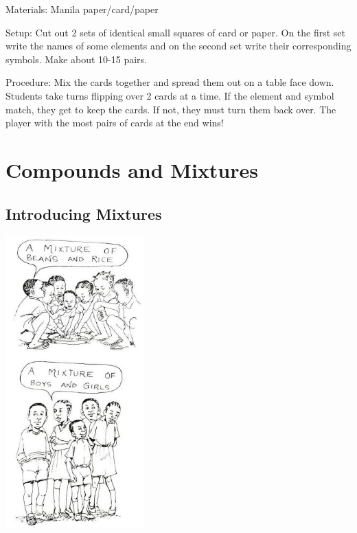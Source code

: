 \begin{multicols}{2}
\begin{description*}
\item[Materials:]{Manila paper/card/paper}
\item[Setup:]{Cut out 2 sets of identical small squares of card or paper. On the first set write the names of some elements and on the second set write their corresponding symbols. Make about 10-15 pairs. }
\item[Procedure:]{Mix the cards together and spread them out on a table face down. Students take turns flipping over 2 cards at a time. If the element and symbol match, they get to keep the cards. If not, they must turn them back over. The player with the most pairs of cards at the end wins!}
\end{description*}


\section*{Compounds and Mixtures}


\subsection{Introducing Mixtures}

\begin{center}
\includegraphics[width=0.4\textwidth]{./img/source/intro-mixtures.jpg}
\end{center}


\end{multicols}
